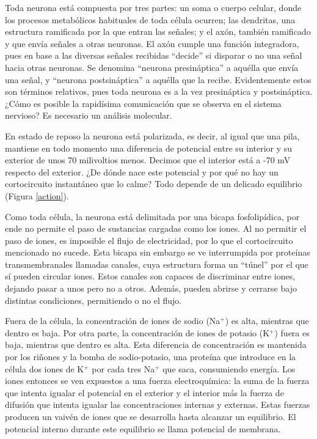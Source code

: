 Toda neurona está compuesta por tres partes: un soma o cuerpo celular, donde los procesos metabólicos habituales de toda célula ocurren; las dendritas, una estructura ramificada por la que entran las señales; y el axón, también ramificado y que envía señales a otras neuronas. El axón cumple una función integradora, pues en base a las diversas señales recibidas \enquote{decide} si disparar o no una señal hacia otras neuronas. Se denomina \enquote{neurona presináptica} a aquélla que envía una señal, y \enquote{neurona postsináptica} a aquélla que la recibe. Evidentemente estos son términos relativos, pues toda neurona es a la vez presináptica y postsináptica. ¿Cómo es posible la rapidísima comunicación que se observa en el sistema nervioso? Es necesario un análisis molecular.

En estado de reposo la neurona está polarizada, es decir, al igual que una pila, mantiene en todo momento una diferencia de potencial entre su interior y su exterior de unos 70 milivoltios menos. Decimos que el interior está a -70 mV respecto del exterior. ¿De dónde nace este potencial y por qué no hay un cortocircuito instantáneo que lo calme? Todo depende de un delicado equilibrio (Figura \ref{action}).

Como toda célula, la neurona está delimitada por una bicapa fosfolipídica, por ende no permite el paso de sustancias cargadas como los iones. Al no permitir el paso de iones, es imposible el flujo de electricidad, por lo que el cortocircuito mencionado no sucede. Esta bicapa sin embargo se ve interrumpida por proteínas transmembranales llamadas canales, cuya estructura forma un \enquote{túnel} por el que sí pueden circular iones. Estos canales son capaces de discriminar entre iones, dejando pasar a unos pero no a otros. Además, pueden abrirse y cerrarse bajo distintas condiciones, permitiendo o no el flujo.

Fuera de la célula, la concentración de iones de sodio (Na$^+$) es alta, mientras que dentro es baja. Por otra parte, la concentración de iones de potasio (K$^+$) fuera es baja, mientras que dentro es alta. Esta diferencia de concentración es mantenida por los riñones y la bomba de sodio-potasio, una proteína que introduce en la célula dos iones de K$^+$ por cada tres Na$^+$ que saca, consumiendo energía. Los iones entonces se ven expuestos a una fuerza electroquímica: la suma de la fuerza que intenta igualar el potencial en el exterior y el interior más la fuerza de difusión que intenta igualar las concentraciones internas y externas. Estas fuerzas producen un vaivén de iones que se desarrolla hasta alcanzar un equilibrio. El potencial interno durante este equilibrio se llama potencial de membrana.

